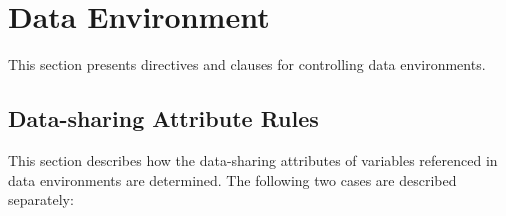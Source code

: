 %
%
%
%
%
%
%
%
%
%
%
%
%


\section{Data Environment}
\label{sec:Data Environment}
This section presents directives and clauses for controlling data environments.

\subsection{Data-sharing Attribute Rules}
\label{subsec:Data-sharing Attribute Rules}
This section describes how the data-sharing attributes of variables referenced in
data environments are determined. The following two cases are described separately:

